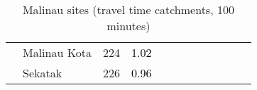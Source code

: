 \begin{table}[ht]
\begin{tabular}{C{0.05\textwidth}C{0.15\textwidth}C{0.08\textwidth}C{0.08\textwidth}C{0.08\textwidth}C{0.08\textwidth}C{0.08\textwidth}C{0.08\textwidth}C{0.08\textwidth}C{0.08\textwidth}}
   & Malinau Kota & 224 & \textcolor[HTML]{000000}{1.02} & \textcolor[HTML]{FFFFFF}{0.35} & \textcolor[HTML]{FFFFFF}{3} &  &  &  &  \\ 
   & Sekatak & 226 & \textcolor[HTML]{000000}{0.96} & \textcolor[HTML]{FFFFFF}{0.33} & \textcolor[HTML]{FFFFFF}{3} &  &  &  &  \\ 
  \end{tabular}
\endgroup
\caption{Malinau sites (travel time catchments, 100 minutes)} 
\label{tab:malinau_time}
\end{table}
